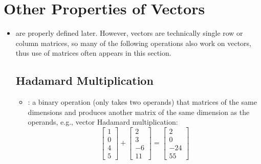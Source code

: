 \newpage
\section{Other Properties of Vectors}\label{Other Properties of Vectors}
\begin{itemize}
  \item \hyperref[tbd]{} are properly defined later. However, vectors are technically single row or column matrices, so many of the following operations also work on vectors, thus use of matrices often appears in this section.
  
  \subsection{Hadamard Multiplication}\label{Vector Hadamard Multiplication}
  \begin{itemize}
    \item {}: a binary operation (only takes two operands) that matrices of the same dimensions and produces another matrix of the same dimension as the operands, e.g., vector Hadamard multiplication:
    \[%
    \begin{bmatrix}
      1 \\
      0 \\
      4 \\
      5 
    \end{bmatrix}
    +
    \begin{bmatrix}
      2 \\
      3 \\
      -6 \\
      11
    \end{bmatrix}
    =
    \begin{bmatrix}
      2 \\
      0 \\
      -24 \\
      55
    \end{bmatrix}
    \]%
  \end{itemize}


\end{itemize}
